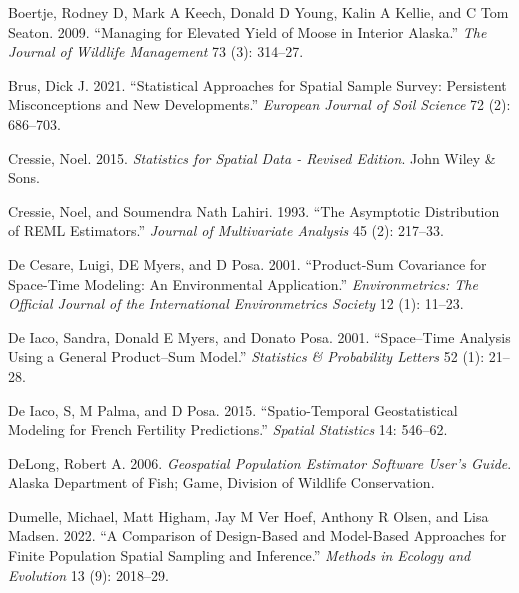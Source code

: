 \documentclass[]{article}    %
\newlength{\cslhangindent}
\newlength{\cslentryspacingunit} %
\newenvironment{CSLReferences}[2] %
 {%
  \setlength{\parindent}{0pt}
  \ifodd #1
  \let\oldpar\par
  \def\par{\hangindent=\cslhangindent\oldpar}
  \fi
  \setlength{\parskip}{#2\cslentryspacingunit}
 }%
 {}
\begin{document}
\hypertarget{refs}{}
\begin{CSLReferences}{1}{0}
\leavevmode{}%
Boertje, Rodney D, Mark A Keech, Donald D Young, Kalin A Kellie, and C
Tom Seaton. 2009. {``Managing for Elevated Yield of Moose in Interior
Alaska.''} \emph{The Journal of Wildlife Management} 73 (3): 314--27.

\leavevmode{}%
Brus, Dick J. 2021. {``Statistical Approaches for Spatial Sample Survey:
Persistent Misconceptions and New Developments.''} \emph{European
Journal of Soil Science} 72 (2): 686--703.

\leavevmode{}%
Cressie, Noel. 2015. \emph{Statistics for Spatial Data - Revised
Edition}. John Wiley \& Sons.

\leavevmode{}%
Cressie, Noel, and Soumendra Nath Lahiri. 1993. {``The Asymptotic
Distribution of REML Estimators.''} \emph{Journal of Multivariate
Analysis} 45 (2): 217--33.

\leavevmode{}%
De Cesare, Luigi, DE Myers, and D Posa. 2001. {``Product-Sum Covariance
for Space-Time Modeling: An Environmental Application.''}
\emph{Environmetrics: The Official Journal of the International
Environmetrics Society} 12 (1): 11--23.

\leavevmode{}%
De Iaco, Sandra, Donald E Myers, and Donato Posa. 2001. {``Space--Time
Analysis Using a General Product--Sum Model.''} \emph{Statistics \&
Probability Letters} 52 (1): 21--28.

\leavevmode{}%
De Iaco, S, M Palma, and D Posa. 2015. {``Spatio-Temporal Geostatistical
Modeling for French Fertility Predictions.''} \emph{Spatial Statistics}
14: 546--62.

\leavevmode{}%
DeLong, Robert A. 2006. \emph{Geospatial Population Estimator Software
User's Guide}. Alaska Department of Fish; Game, Division of Wildlife
Conservation.

\leavevmode{}%
Dumelle, Michael, Matt Higham, Jay M Ver Hoef, Anthony R Olsen, and Lisa
Madsen. 2022. {``A Comparison of Design-Based and Model-Based Approaches
for Finite Population Spatial Sampling and Inference.''} \emph{Methods
in Ecology and Evolution} 13 (9): 2018--29.


\end{CSLReferences}
\end{document}
